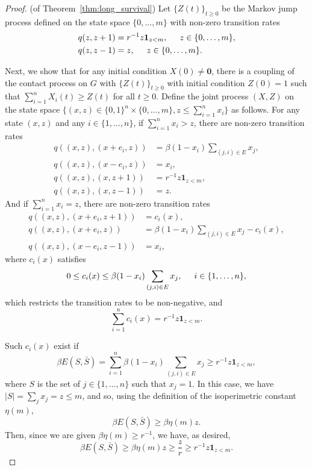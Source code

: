 \documentclass[11pt]{article}
\begin{document}
\begin{proof} (of Theorem~\ref{thm:long_survival})
Let $\{Z(t)\}_{t\geq 0}$ be the Markov jump process defined on the state space $\{0,\ldots,m\}$ with non-zero transition rates
$$\begin{aligned}
q(z,z+1) &= r^{-1}z\mathbf{1}_{z<m}, \hspace{0.5cm} z\in \{0,\ldots,m\}, \\
q(z,z-1) &= z, \hspace{0.5cm} z\in \{0,\ldots,m\}.
\end{aligned}$$

Next, we show that for any initial condition $X(0)\neq \mathbf{0}$, there is a coupling of the contact process on $G$ with $\{Z(t)\}_{t\geq 0}$ with initial condition $Z(0)=1$ such that $\sum_{i=1}^n X_i(t) \geq Z(t)$ for all $t\geq 0$. Define the joint process  $(X,Z)$ on the state space $\{(x,z)\in \{0,1\}^n \times \{0,\ldots,m\},z\leq \sum_{i=1}^n x_i\}$ as follows. For any state $(x,z)$ and any $i\in \{1,\ldots,n\}$, if $\sum_{i=1}^n x_i > z$, there are non-zero transition rates
$$\begin{aligned}
q((x,z),(x+e_i,z)) &= \beta(1-x_i) \sum_{(j,i)\in E} x_j, \\
q((x,z),(x-e_i,z)) &= x_i, \\
q((x,z),(x,z+1)) &= r^{-1}z \mathbf{1}_{z<m}, \\
q((x,z),(x,z-1)) &= z.
\end{aligned}$$
And if $\sum_{i=1}^n x_i = z$, there are non-zero transition rates
$$\begin{aligned}
q((x,z),(x+e_i,z+1)) &= c_i(x), \\
q((x,z),(x+e_i,z)) &= \beta(1-x_i) \sum_{(j,i)\in E} x_j - c_i(x), \\
q((x,z),(x-e_i,z-1)) &= x_i,
\end{aligned}$$
where $c_i(x)$ satisfies
$$0\leq c_i(x)\leq \beta(1-x_i) \sum_{(j,i)\in E} x_j, \hspace{0.5cm} i\in \{1,\ldots,n\},$$
which restricts the transition rates to be non-negative, and
$$\sum_{i=1}^n c_i(x) = r^{-1} z \mathbf{1}_{z<m}.$$

Such $c_i(x)$ exist if
$$\beta E(S,\bar S) = \sum_{i=1}^n \beta(1-x_i) \sum_{(j,i)\in E} x_j \geq r^{-1}z \mathbf{1}_{z<m},$$
where $S$ is the set of $j\in \{1,\ldots,n\}$ such that $x_j=1$. In this case, we have $|S| = \sum_j x_j = z\leq m$, and so, using the definition of the isoperimetric constant $\eta (m)$,
$$\beta E(S,\bar S) \geq \beta \eta(m) z.$$
Then, since we are given $\beta \eta(m) \geq r^{-1}$, we have, as desired,
$$\beta E(S,\bar S) \geq \beta \eta(m) z \geq \frac{z}{r} \geq r^{-1}z \mathbf{1}_{z<m}.$$


\end{proof}
\end{document}
